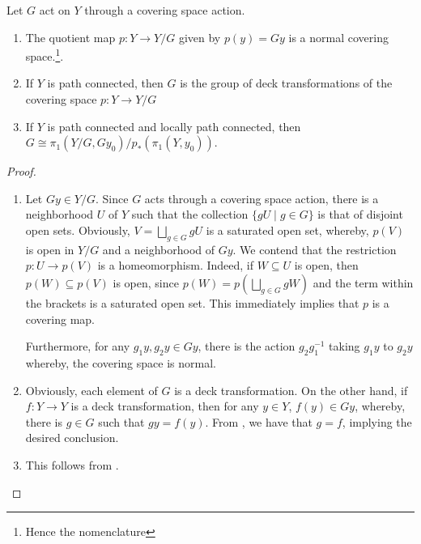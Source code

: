 \begin{theorem}
    Let $G$ act on $Y$ through a covering space action.
    \begin{enumerate}[label=(\alph*)]
        \item The quotient map $p: Y\to Y/G$ given by $p(y) = Gy$ is a normal covering space.\footnote{Hence the nomenclature}.
        \item If $Y$ is path connected, then $G$ is the group of deck transformations of the covering space $p: Y\to Y/G$ 
        \item If $Y$ is path connected and locally path connected, then $G\cong\pi_1(Y/G, Gy_0)/p_*(\pi_1(Y, y_0))$.
    \end{enumerate}
\end{theorem}
\begin{proof}
\begin{enumerate}[label=(\alph*)]
    \item Let $Gy\in Y/G$. Since $G$ acts through a covering space action, there is a neighborhood $U$ of $Y$ such that the collection $\{gU\mid g\in G\}$ is that of disjoint open sets. Obviously, $V = \bigsqcup_{g\in G}gU$ is a saturated open set, whereby, $p(V)$ is open in $Y/G$ and a neighborhood of $Gy$. We contend that the restriction $p: U\to p(V)$ is a homeomorphism. Indeed, if $W\subseteq U$ is open, then $p(W)\subseteq p(V)$ is open, since $p(W) = p\left(\bigsqcup_{g\in G}gW\right)$ and the term within the brackets is a saturated open set. This immediately implies that $p$ is a covering map.

    Furthermore, for any $g_1y,g_2y\in Gy$, there is the action $g_2g_1^{-1}$ taking $g_1y$ to $g_2y$ whereby, the covering space is normal.

    \item Obviously, each element of $G$ is a deck transformation. On the other hand, if $f: Y\to Y$ is a deck transformation, then for any $y\in Y$, $f(y)\in Gy$, whereby, there is $g\in G$ such that $gy = f(y)$. From , we have that $g=f$, implying the desired conclusion. 
    
    \item This follows from .
\end{enumerate}
\end{proof}